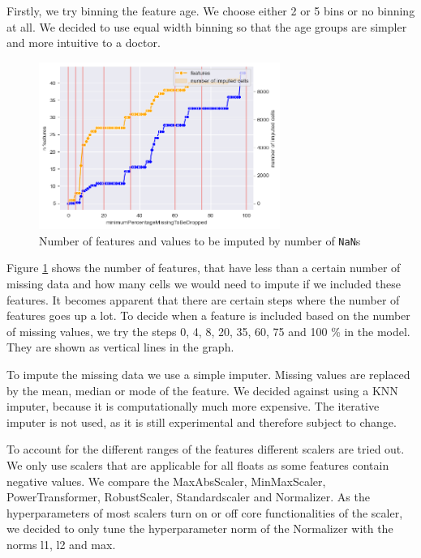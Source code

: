 Firstly, we try binning the feature age. We choose either 2 or 5 bins or no binning at all. We decided to use equal width binning so that the age groups are simpler and more intuitive to a doctor.

\begin{figure}[h]
	\centering
	\includegraphics[width=0.7\textwidth]{images/percentageToBeDropped.png}
	\caption{Number of features and values to be imputed by number of \texttt{NaN}s}
	\label{fig:percentageToBeDropped}
\end{figure}
Figure \ref{fig:percentageToBeDropped} shows the number of features, that have less than a certain number of missing data and how many cells we would need to impute if we included these features. It becomes apparent that there are certain steps where the number of features goes up a lot. To decide when a feature is included based on the number of missing values, we try the steps 0, 4, 8, 20, 35, 60, 75 and 100 \% in the model. They are shown as vertical lines in the graph. 

To impute the missing data we use a simple imputer. Missing values are replaced by the mean, median or mode of the feature. We decided against using a KNN imputer, because it is computationally much more expensive. The iterative imputer is not used, as it is still experimental and therefore subject to change.

To account for the different ranges of the features different scalers are tried out. We only use scalers that are applicable for all floats as some features contain negative values.
We compare the MaxAbsScaler, MinMaxScaler, PowerTransformer, RobustScaler, Standardscaler and Normalizer. As the hyperparameters of most scalers turn on or off core functionalities of the scaler, we decided to only tune the hyperparameter norm of the Normalizer with the norms l1, l2 and max.


